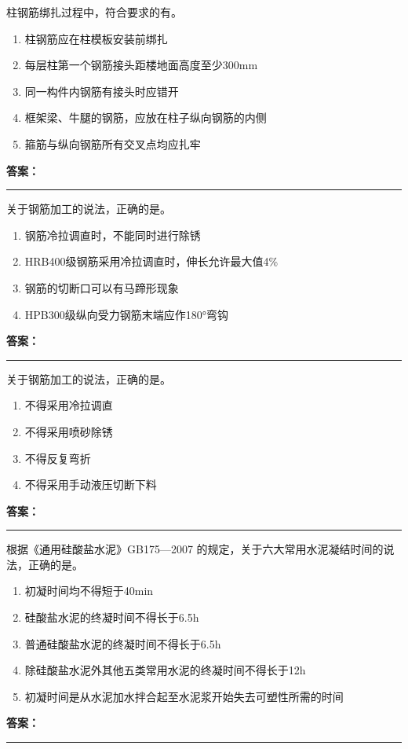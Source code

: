 \documentclass[UTF8,fontset=fandol,11pt]{ctexart}
\newcommand{\answerline}{\textcolor{answerred}{\rule{2.4cm}{0.7pt}}}
\begin{document}
\begin{quizbox}[title={第 29 题}]
柱钢筋绑扎过程中，符合要求的有。\\
\begin{enumerate}[label=\Alph*.]
\item 柱钢筋应在柱模板安装前绑扎
\item 每层柱第一个钢筋接头距楼地面高度至少300mm
\item 同一构件内钢筋有接头时应错开
\item 框架梁、牛腿的钢筋，应放在柱子纵向钢筋的内侧
\item 箍筋与纵向钢筋所有交叉点均应扎牢
\end{enumerate}
\textbf{\textcolor{answerred}{答案：}} \answerline
\end{quizbox}

\begin{quizbox}[title={第 30 题}]
关于钢筋加工的说法，正确的是。\\
\begin{enumerate}[label=\Alph*.]
\item 钢筋冷拉调直时，不能同时进行除锈
\item HRB400级钢筋采用冷拉调直时，伸长允许最大值4\%
\item 钢筋的切断口可以有马蹄形现象
\item HPB300级纵向受力钢筋末端应作180°弯钩
\end{enumerate}
\textbf{\textcolor{answerred}{答案：}} \answerline
\end{quizbox}

\begin{quizbox}[title={第 31 题}]
关于钢筋加工的说法，正确的是。\\
\begin{enumerate}[label=\Alph*.]
\item 不得采用冷拉调直
\item 不得采用喷砂除锈
\item 不得反复弯折
\item 不得采用手动液压切断下料
\end{enumerate}
\textbf{\textcolor{answerred}{答案：}} \answerline
\end{quizbox}

\begin{quizbox}[title={第 32 题}]
根据《通用硅酸盐水泥》GB175—2007 的规定，关于六大常用水泥凝结时间的说法，正确的是。\\
\begin{enumerate}[label=\Alph*.]
\item 初凝时间均不得短于40min
\item 硅酸盐水泥的终凝时间不得长于6.5h
\item 普通硅酸盐水泥的终凝时间不得长于6.5h
\item 除硅酸盐水泥外其他五类常用水泥的终凝时间不得长于12h
\item 初凝时间是从水泥加水拌合起至水泥浆开始失去可塑性所需的时间
\end{enumerate}
\textbf{\textcolor{answerred}{答案：}} \answerline
\end{quizbox}
\end{document}
